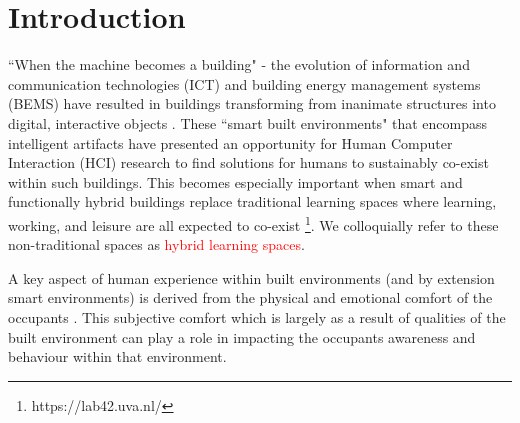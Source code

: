 \documentclass[acmconf, anonymous, review]{acmart}
\begin{document}



 
\maketitle

\section{Introduction}
``When the machine becomes a building" - the evolution of information and communication technologies (ICT) and building energy management systems (BEMS) have resulted in buildings transforming from inanimate structures into digital, interactive objects \cite{nembrini2017human}. These ``smart built environments" that encompass intelligent artifacts have presented an opportunity for Human Computer Interaction (HCI) research to find solutions for humans to sustainably co-exist within such buildings. This becomes especially important when smart and functionally hybrid buildings replace traditional learning spaces where learning, working, and leisure are all expected to co-exist \footnote{https://lab42.uva.nl/}. We colloquially refer to these non-traditional spaces as \textcolor{red}{hybrid learning spaces}. 

A key aspect of human experience within built environments (and by extension smart environments) is derived from the physical and emotional comfort of the occupants \cite{alavi2017comfort}. This subjective comfort which is largely as a result of qualities of the built environment can play a role in impacting the occupants awareness and behaviour within that environment.  
\end{document}

